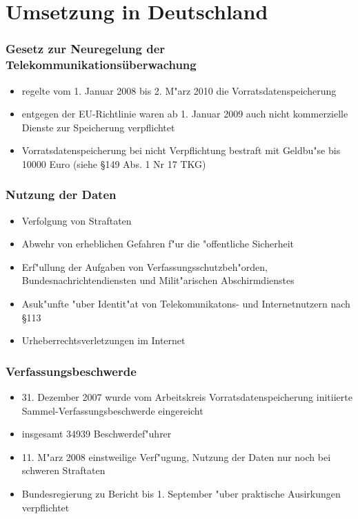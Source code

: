 
\section{Umsetzung in Deutschland}

  \begin{frame}
  \frametitle{Gesetz zur Neuregelung der Telekommunikationsüberwachung}
    \begin{itemize}
      \item 
        regelte vom 1. Januar 2008 bis 2. M"arz 2010 die Vorratsdatenspeicherung
      \item 
        entgegen der EU-Richtlinie waren ab 1. Januar 2009 auch nicht kommerzielle Dienste zur Speicherung verpflichtet
      \item 
        Vorratsdatenspeicherung bei nicht Verpflichtung bestraft mit Geldbu"se bis 10000 Euro (siehe \S 149 Abs. 1 Nr 17 TKG)
    \end{itemize}
  \end{frame}

  \begin{frame}
    \frametitle{Nutzung der Daten}
    \begin{itemize}
      \item Verfolgung von Straftaten
      \item Abwehr von erheblichen Gefahren f"ur die "offentliche Sicherheit
      \item Erf"ullung der Aufgaben von Verfassungsschutzbeh"orden, Bundesnachrichtendiensten und Milit"arischen Abschirmdienstes
      \item Asuk"unfte "uber Identit"at von Telekomunikatons- und Internetnutzern nach \S 113
      \item Urheberrechtsverletzungen im Internet
    \end{itemize}
  \end{frame}

  \begin{frame}
    \frametitle{Verfassungsbeschwerde}
    \begin{itemize}
      \item 31. Dezember 2007 wurde vom Arbeitskreis Vorratsdatenspeicherung initiierte Sammel-Verfassungsbeschwerde eingereicht
      \item insgesamt 34939 Beschwerdef"uhrer
      \item 11. M"arz 2008 einstweilige Verf"ugung, Nutzung der Daten nur noch bei schweren Straftaten
      \item Bundesregierung zu Bericht bis 1. September "uber praktische Ausirkungen verpflichtet
    \end{itemize}
  \end{frame}

